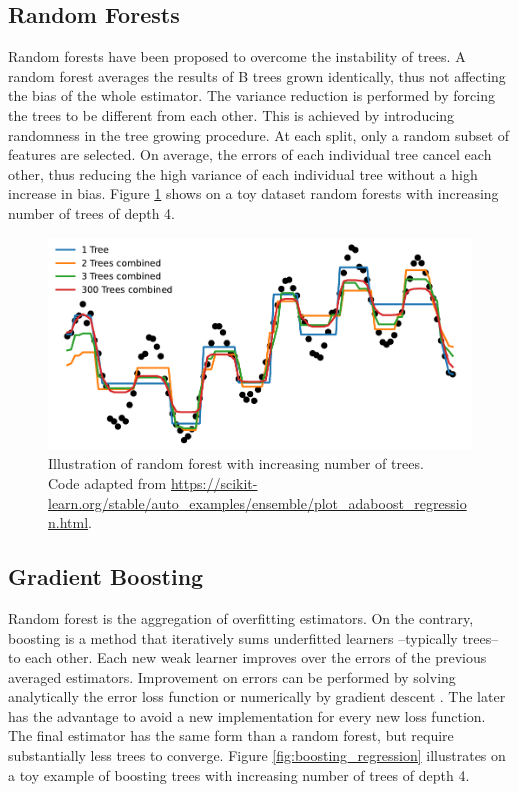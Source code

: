 \documentclass[french,12pt,twoside,a4paper]{book}
\begin{document}
\begin{appendices}
  \subsection{Random Forests}\label{apd:intro:random_forests}

  Random forests \citep{breiman2001random} have been proposed to overcome the
  instability of trees. A random forest averages the results of B trees grown
  identically, thus not affecting the bias of the whole estimator. The variance
  reduction is performed by forcing the trees to be different from each other.
  This is achieved by introducing randomness in the tree growing procedure. At
  each split, only a random subset of features are selected. On average, the
  errors of each individual tree cancel each other, thus reducing the high
  variance of each individual tree without a high increase in bias. Figure
  \ref{fig:forest_regression} shows on a toy dataset random forests with
  increasing number of trees of depth 4.

  \begin{figure}[!t]
    \centering
    \includegraphics[width=0.8\linewidth]{img/chapter_1/forest_4.pdf}
    \caption{Illustration of random forest with increasing number of
      trees.\\Code adapted from
      \url{https://scikit-learn.org/stable/auto_examples/ensemble/plot_adaboost_regression.html}.}%
    \label{fig:forest_regression}
  \end{figure}


  \subsection{Gradient Boosting}\label{apd:intro:boosting}

  Random forest is the aggregation of overfitting estimators. On the contrary,
  boosting \citep{freund1995desicion} is a method that iteratively sums
  underfitted learners --typically trees-- to each other. Each new weak learner
  improves over the errors of the previous averaged estimators. Improvement on
  errors can be performed by solving analytically the error loss function or
  numerically by gradient descent \citep{friedman2001greedy}. The later has the
  advantage to avoid a new implementation for every new loss function. The final
  estimator has the same form than a random forest, but require substantially
  less trees to converge. Figure \ref{fig:boosting_regression} illustrates on a
  toy example of boosting trees with increasing number of trees of depth 4.


\end{appendices}
\end{document}
